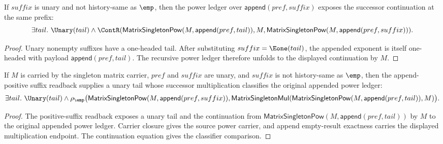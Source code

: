 \begin{theorem}
\label{thm:matrix-singleton-pow-append-positive-suffix-cont-readback}
If $suffix$ is unary and not history-same as $\emp$, then the power ledger
over $\mathsf{append}(pref,suffix)$ exposes the successor continuation at the
same prefix:
$$
\exists tail.\ \Unary(tail)\land
\ContR(\mathsf{MatrixSingletonPow}(M,\mathsf{append}(pref,tail)),M,
\mathsf{MatrixSingletonPow}(M,\mathsf{append}(pref,suffix))).
$$
\end{theorem}
\begin{proof}
Unary nonempty suffixes have a one-headed tail. After substituting
$suffix=\Eone(tail)$, the appended exponent is itself one-headed with payload
$\mathsf{append}(pref,tail)$. The recursive power ledger therefore unfolds to
the displayed continuation by $M$.
\end{proof}

\begin{theorem}
\label{thm:matrix-singleton-pow-append-positive-suffix-classifier-readback}
If $M$ is carried by the singleton matrix carrier, $pref$ and $suffix$ are
unary, and $suffix$ is not history-same as $\emp$, then the append-positive
suffix readback supplies a unary tail whose successor multiplication classifies
the original appended power ledger:
$$
\exists tail.\ \Unary(tail)\land
\rho_{\emp}\bigl(\mathsf{MatrixSingletonPow}(M,\mathsf{append}(pref,suffix)),
\mathsf{MatrixSingletonMul}(\mathsf{MatrixSingletonPow}(M,\mathsf{append}(pref,tail)),M)\bigr).
$$
\end{theorem}
\begin{proof}
The positive-suffix readback exposes a unary tail and the continuation from
$\mathsf{MatrixSingletonPow}(M,\mathsf{append}(pref,tail))$ by $M$ to the
original appended power ledger. Carrier closure gives the source power carrier,
and append empty-result exactness carries the displayed multiplication endpoint.
The continuation equation gives the classifier comparison.
\end{proof}

